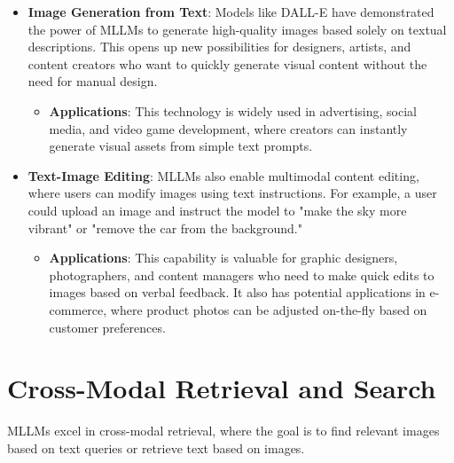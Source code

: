 \begin{itemize}
    \item \textbf{Image Generation from Text}: Models like DALL-E have demonstrated the power of MLLMs to generate high-quality images based solely on textual descriptions. This opens up new possibilities for designers, artists, and content creators who want to quickly generate visual content without the need for manual design.
    \begin{itemize}
        \item \textbf{Applications}: This technology is widely used in advertising, social media, and video game development, where creators can instantly generate visual assets from simple text prompts.
    \end{itemize}
    \item \textbf{Text-Image Editing}: MLLMs also enable multimodal content editing, where users can modify images using text instructions. For example, a user could upload an image and instruct the model to "make the sky more vibrant" or "remove the car from the background."
    \begin{itemize}
        \item \textbf{Applications}: This capability is valuable for graphic designers, photographers, and content managers who need to make quick edits to images based on verbal feedback. It also has potential applications in e-commerce, where product photos can be adjusted on-the-fly based on customer preferences.
    \end{itemize}
\end{itemize}

\section{Cross-Modal Retrieval and Search}

MLLMs excel in cross-modal retrieval, where the goal is to find relevant images based on text queries or retrieve text based on images.

